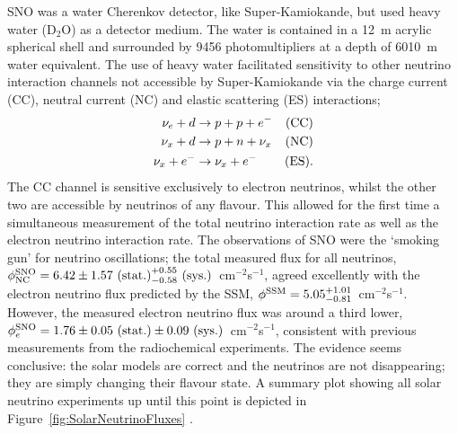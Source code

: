 SNO was a water Cherenkov detector, like Super-Kamiokande, but used heavy water (D$_2$O) as a detector medium.  The water is contained in a 12~m acrylic spherical shell and surrounded by 9456 photomultipliers at a depth of 6010~m water equivalent.  The use of heavy water facilitated sensitivity to other neutrino interaction channels not accessible by Super-Kamiokande via the charge current (CC), neutral current (NC) and elastic scattering (ES) interactions;
\begin{align}
  \nu_e + d &\rightarrow p + p + e^- &\textnormal{(CC)} \\
  \nu_x + d &\rightarrow p + n + \nu_x &\textnormal{(NC)} \\
  \nu_x + e^- &\rightarrow \nu_x + e^- &\textnormal{(ES)}.
\end{align}
The CC channel is sensitive exclusively to electron neutrinos, whilst the other two are accessible by neutrinos of any flavour.  This allowed for the first time a simultaneous measurement of the total neutrino interaction rate as well as the electron neutrino interaction rate.  The observations of SNO were the `smoking gun' for neutrino oscillations; the total measured flux for all neutrinos, $\phi_{\textnormal{NC}}^{\textnormal{SNO}} = 6.42\pm1.57\textnormal{~(stat.)}^{+0.55}_{-0.58}\textnormal{~(sys.)}$~cm$^{-2}$s$^{-1}$, agreed excellently with the electron neutrino flux predicted by the SSM, $\phi^{\textnormal{SSM}} = 5.05^{+1.01}_{-0.81}$~cm$^{-2}$s$^{-1}$.  However, the measured electron neutrino flux was around a third lower, $\phi_e^{\textnormal{SNO}} = 1.76\pm0.05\textnormal{~(stat.)}\pm0.09\textnormal{~(sys.)}$~cm$^{-2}$s$^{-1}$, consistent with previous measurements from the radiochemical experiments.  The evidence seems conclusive: the solar models are correct and the neutrinos are not disappearing; they are simply changing their flavour state.  A summary plot showing all solar neutrino experiments up until this point is depicted in Figure~\ref{fig:SolarNeutrinoFluxes} \cite{Bahcall2005Fluxes}.

